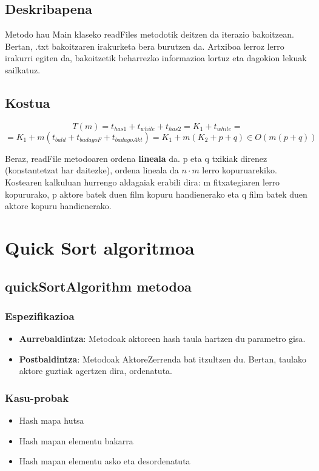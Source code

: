 \documentclass[a4paper,10pt]{report}
\begin{document}
	\subsection*{Deskribapena}
		Metodo hau Main klaseko readFiles metodotik deitzen da iterazio bakoitzean. Bertan, .txt bakoitzaren irakurketa bera burutzen da. Artxiboa lerroz lerro irakurri egiten da, bakoitzetik beharrezko informazioa lortuz eta dagokion lekuak sailkatuz.
	\subsection*{Kostua}
		\[
			T(m) = t_{has1} + t_{while} + t_{has2} = K_{1} + t_{while} =
		\]
		\[
			= K_{1} + m(t_{bald} + t_{badagoF} + t_{badagoAkt}) = K_{1} + m(K_{2} + p + q) \in O(m(p+q))
		\]
		
		Beraz, readFile metodoaren ordena \textbf{lineala} da. p eta q txikiak direnez (konstantetzat har daitezke), ordena lineala da $n·m$ lerro kopuruarekiko.\\
		Kostearen kalkuluan hurrengo aldagaiak erabili dira: m fitxategiaren lerro kopururako, p aktore batek duen film kopuru handienerako eta q film batek  duen aktore kopuru handienerako.

\section{Quick Sort algoritmoa}

	\subsection{quickSortAlgorithm metodoa}
		\subsubsection*{Espezifikazioa}
			\begin{itemize}
				\item \textbf{Aurrebaldintza}: Metodoak aktoreen hash taula hartzen du parametro gisa.
				\item \textbf{Postbaldintza}: Metodoak AktoreZerrenda bat itzultzen du. Bertan, taulako aktore guztiak agertzen dira, ordenatuta.
			\end{itemize}
		\subsubsection*{Kasu-probak}
		\begin{itemize}
			\item Hash mapa hutsa
			\item Hash mapan elementu bakarra
			\item Hash mapan elementu asko eta desordenatuta
		\end{itemize}
\end{document}
